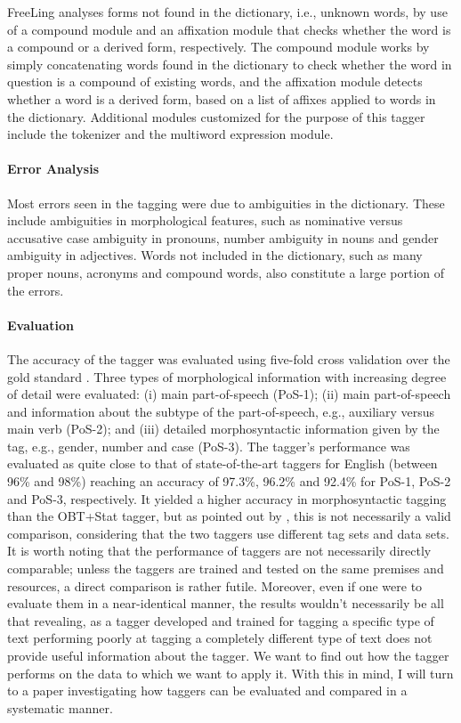 \documentclass[a4paper,12pt,english]{book}
\begin{document}
FreeLing analyses forms not found in the dictionary, i.e., unknown words, by
use of a compound module and an affixation module that checks whether the word
is a compound or a derived form, respectively. The compound module works by
simply concatenating words found in the dictionary to check whether the word in
question is a compound of existing words, and the affixation module detects
whether a word is a derived form, based on a list of affixes applied to words
in the dictionary. Additional modules customized for the purpose of this tagger
include the tokenizer and the multiword expression module.

\paragraph{Error Analysis}
Most errors seen in the tagging were due to
ambiguities in the dictionary. These include ambiguities in morphological
features, such as nominative versus accusative case ambiguity in pronouns,
number ambiguity in nouns and gender ambiguity in adjectives. Words not
included in the dictionary, such as  many proper nouns, acronyms and compound
words, also constitute a large portion of the errors.

\paragraph{Evaluation}
The accuracy of the tagger was evaluated using five-fold cross validation over
the gold standard . Three types of morphological information with
increasing degree of detail were evaluated: (i) main part-of-speech (PoS-1);
(ii) main part-of-speech and information about the subtype of the
part-of-speech, e.g., auxiliary versus main verb (PoS-2); and (iii) detailed
morphosyntactic information given by the tag, e.g., gender, number and case
(PoS-3). The tagger's performance was evaluated as quite close to that of
state-of-the-art taggers for English (between 96\% and 98\%) reaching an
accuracy of 97.3\%, 96.2\% and 92.4\% for PoS-1, PoS-2 and PoS-3, respectively.
It yielded a higher accuracy in morphosyntactic tagging than the OBT+Stat
tagger, but as pointed out by , this is not necessarily a valid
comparison, considering that the two taggers use different tag sets and data
sets. It is worth noting that the performance of taggers are not necessarily
directly comparable; unless the taggers are trained  and tested on the same
premises and resources, a direct comparison is rather futile. Moreover, even if
one were to evaluate them in a near-identical manner, the results wouldn't
necessarily be all that revealing, as a tagger developed and trained for
tagging a specific type of text performing poorly at tagging a completely
different type of text does not provide useful information about the tagger. We
want to find out how the tagger performs on the data to which we want to apply
it. With this in mind, I will turn to a paper investigating how taggers can be
evaluated and compared in a systematic manner.
\end{document}
